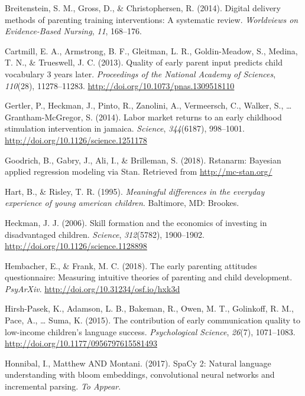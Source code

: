 \documentclass[man,floatsintext]{apa6}
\begin{document}
\leavevmode\hypertarget{ref-Breitenstein2014}{}%
Breitenstein, S. M., Gross, D., \& Christophersen, R. (2014). Digital delivery methods of parenting training interventions: A systematic review. \emph{Worldviews on Evidence-Based Nursing}, \emph{11}, 168--176.

\leavevmode\hypertarget{ref-Cartmill2013}{}%
Cartmill, E. A., Armstrong, B. F., Gleitman, L. R., Goldin-Meadow, S., Medina, T. N., \& Trueswell, J. C. (2013). Quality of early parent input predicts child vocabulary 3 years later. \emph{Proceedings of the National Academy of Sciences}, \emph{110}(28), 11278--11283. \url{http://doi.org/10.1073/pnas.1309518110}

\leavevmode\hypertarget{ref-Jamaica2014}{}%
Gertler, P., Heckman, J., Pinto, R., Zanolini, A., Vermeersch, C., Walker, S., \ldots{} Grantham-McGregor, S. (2014). Labor market returns to an early childhood stimulation intervention in jamaica. \emph{Science}, \emph{344}(6187), 998--1001. \url{http://doi.org/10.1126/science.1251178}

\leavevmode\hypertarget{ref-rstanarm}{}%
Goodrich, B., Gabry, J., Ali, I., \& Brilleman, S. (2018). Rstanarm: Bayesian applied regression modeling via Stan. Retrieved from \url{http://mc-stan.org/}

\leavevmode\hypertarget{ref-Hart1995}{}%
Hart, B., \& Risley, T. R. (1995). \emph{Meaningful differences in the everyday experience of young american children}. Baltimore, MD: Brookes.

\leavevmode\hypertarget{ref-Heckman2006}{}%
Heckman, J. J. (2006). Skill formation and the economics of investing in disadvantaged children. \emph{Science}, \emph{312}(5782), 1900--1902. \url{http://doi.org/10.1126/science.1128898}

\leavevmode\hypertarget{ref-Hembacher2018}{}%
Hembacher, E., \& Frank, M. C. (2018). The early parenting attitudes questionnaire: Measuring intuitive theories of parenting and child development. \emph{PsyArXiv}. \url{http://doi.org/10.31234/osf.io/hxk3d}

\leavevmode\hypertarget{ref-HirshPasek2015}{}%
Hirsh-Pasek, K., Adamson, L. B., Bakeman, R., Owen, M. T., Golinkoff, R. M., Pace, A., \ldots{} Suma, K. (2015). The contribution of early communication quality to low-income children's language success. \emph{Psychological Science}, \emph{26}(7), 1071--1083. \url{http://doi.org/10.1177/0956797615581493}

\leavevmode\hypertarget{ref-spacy2}{}%
Honnibal, I., Matthew AND Montani. (2017). SpaCy 2: Natural language understanding with bloom embeddings, convolutional neural networks and incremental parsing. \emph{To Appear}.
\end{document}
